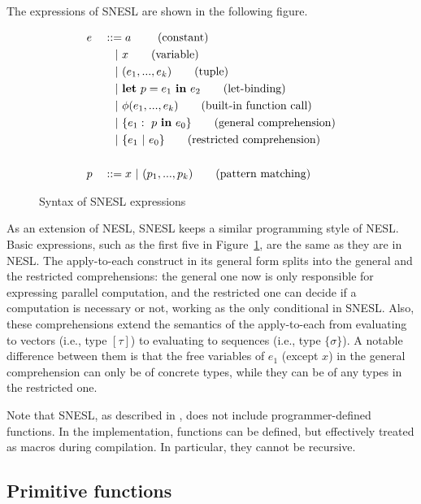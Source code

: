 The expressions of SNESL are shown in the following figure.

\begin{figure}[H]\large 
\begin{alignat*}{2}
& e &&::=  a \     \tag{constant} \\
&   && \quad | \ x  \tag{variable} \\
&   && \quad | \ (e_1,...,e_k) \tag{tuple}\\
&   && \quad | \ \mathbf{let} \ p = e_1 \ \mathbf{in} \ e_2 \tag{let-binding}\\
&   && \quad | \ \phi{(e_1,...,e_k)}  \tag{built-in function call} \\
&   && \quad | \ \{e_1: \ p \ \mathbf{in} \ e_0 \} \tag{general comprehension} \\
&   && \quad | \ \{e_1 \ | \ e_0 \}\tag {restricted comprehension} \\
\\
& p &&:: = x \ | \ (p_1,...,p_k)  \tag{pattern matching}
\end{alignat*}
\caption{Syntax of SNESL expressions \label{fig-snesl-exps}}
\end{figure}

As an extension of NESL, SNESL keeps a similar programming style of NESL. 
Basic expressions, such as the first five in Figure~\ref{fig-snesl-exps}, are the same as they are in NESL. 
The apply-to-each construct in its general form splits into the general and the restricted comprehensions:
the general one now is only responsible for expressing parallel computation,
and the restricted one can decide if a computation is necessary or not, working as the only conditional in SNESL.
Also, these comprehensions extend the semantics of the apply-to-each from evaluating to vectors (i.e., type $[\tau]$) to evaluating to sequences (i.e., type $\{\sigma\}$). 
A notable difference between them is that the free variables of $e_1$ (except $x$) in the general comprehension can only be of concrete types, while they can be of any types in the restricted one.

Note that SNESL, as described in \cite{Fphd}, does not include programmer-defined functions. 
In the implementation, functions can be defined, but effectively treated as macros during compilation.
In particular, they cannot be recursive.

\subsection{Primitive functions}

